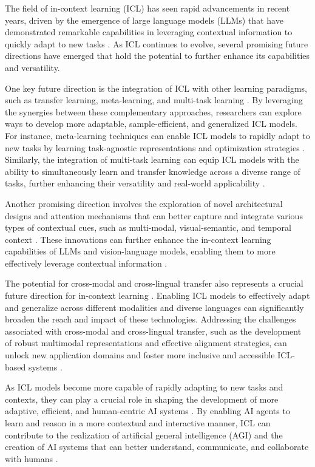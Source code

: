 \documentclass[11pt]{article}
\begin{document}
The field of in-context learning (ICL) has seen rapid advancements in recent years, driven by the emergence of large language models (LLMs) that have demonstrated remarkable capabilities in leveraging contextual information to quickly adapt to new tasks \cite{ref6,ref67}. As ICL continues to evolve, several promising future directions have emerged that hold the potential to further enhance its capabilities and versatility.

One key future direction is the integration of ICL with other learning paradigms, such as transfer learning, meta-learning, and multi-task learning \cite{ref68,ref69}. By leveraging the synergies between these complementary approaches, researchers can explore ways to develop more adaptable, sample-efficient, and generalized ICL models. For instance, meta-learning techniques can enable ICL models to rapidly adapt to new tasks by learning task-agnostic representations and optimization strategies \cite{ref2}. Similarly, the integration of multi-task learning can equip ICL models with the ability to simultaneously learn and transfer knowledge across a diverse range of tasks, further enhancing their versatility and real-world applicability \cite{ref70}.

Another promising direction involves the exploration of novel architectural designs and attention mechanisms that can better capture and integrate various types of contextual cues, such as multi-modal, visual-semantic, and temporal context \cite{ref71,ref72}. These innovations can further enhance the in-context learning capabilities of LLMs and vision-language models, enabling them to more effectively leverage contextual information \cite{ref11,ref73}.

The potential for cross-modal and cross-lingual transfer also represents a crucial future direction for in-context learning \cite{ref74,ref75}. Enabling ICL models to effectively adapt and generalize across different modalities and diverse languages can significantly broaden the reach and impact of these technologies. Addressing the challenges associated with cross-modal and cross-lingual transfer, such as the development of robust multimodal representations and effective alignment strategies, can unlock new application domains and foster more inclusive and accessible ICL-based systems \cite{ref76,ref77}.

As ICL models become more capable of rapidly adapting to new tasks and contexts, they can play a crucial role in shaping the development of more adaptive, efficient, and human-centric AI systems \cite{ref78,ref21}. By enabling AI agents to learn and reason in a more contextual and interactive manner, ICL can contribute to the realization of artificial general intelligence (AGI) and the creation of AI systems that can better understand, communicate, and collaborate with humans \cite{ref73,ref79}.
\end{document}
